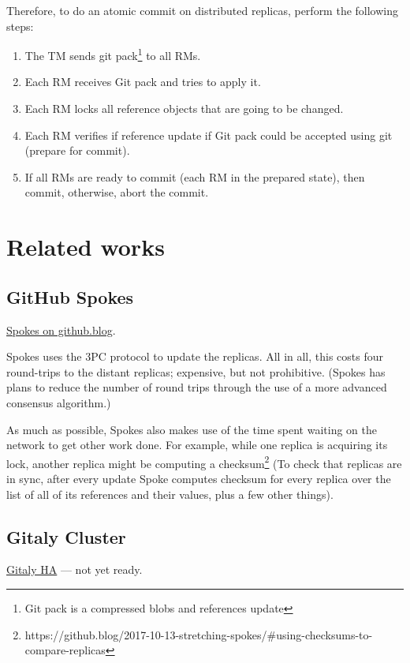 \documentclass[sigplan, screen, nonacm, 11pt]{acmart}
\begin{document}
Therefore, to do an atomic commit on distributed replicas, perform the following steps:
\begin{enumerate}
  \item The TM sends git pack\footnote{Git pack is a compressed blobs and references update}
    to all RMs.
  \item Each RM receives Git pack and tries to apply it.
  \item Each RM locks all reference objects that are going to be changed.
  \item Each RM verifies if reference update if Git pack could be accepted using git (prepare for commit).
  \item If all RMs are ready to commit (each RM in the prepared state), then commit, otherwise, abort the commit.
\end{enumerate}

\section{Related works}

\subsection{GitHub Spokes}

\href{https://github.blog/2017-10-13-stretching-spokes/}{Spokes on github.blog}.

Spokes uses the 3PC protocol to update the replicas.
All in all, this costs four round-trips to the distant replicas;
expensive, but not prohibitive.
(Spokes has plans to reduce the number of round trips through the use of a more advanced consensus algorithm.)

As much as possible, Spokes also makes use of the time spent waiting on the network to get other work done.
For example, while one replica is acquiring its lock,
another replica might be computing a checksum\footnote{https://github.blog/2017-10-13-stretching-spokes/\#using-checksums-to-compare-replicas} (To check that replicas are in sync, after every update Spoke computes checksum for every replica over the list of all of its references and their values, plus a few other things).

\subsection{Gitaly Cluster}

\href{https://gitlab.com/groups/gitlab-org/-/epics/1189}{Gitaly HA} --- not yet ready.
\end{document}
